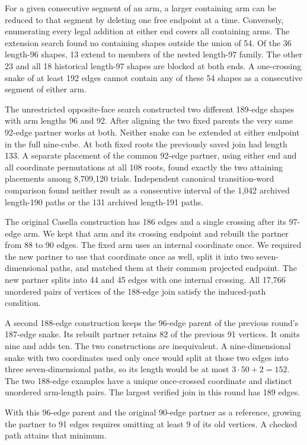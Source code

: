 \documentclass[11pt,a4paper]{article}
\theoremstyle{definition}
\theoremstyle{remark}
\begin{document}
For a given consecutive segment of an arm, a larger containing arm
can be reduced to that segment by deleting one free endpoint at a time.
Conversely, enumerating every legal addition at either end covers all
containing arms. The extension search found no containing shapes outside
the union of 54. Of the 36 length-96 shapes, 13 extend to members of
the nested length-97 family. The other 23 and all 18 historical
length-97 shapes are blocked at both ends. A one-crossing snake of at least 192 edges cannot contain any of these 54 shapes as a consecutive segment of either arm.

The unrestricted opposite-face search constructed two different
189-edge shapes with arm lengths 96 and 92. After aligning the two
fixed parents the very same 92-edge partner works at both. Neither
snake can be extended at either endpoint in the full nine-cube. At both fixed roots the
previously saved join had length 133. A separate placement of the
common 92-edge partner, using either end and all coordinate
permutations at all 108 roots, found exactly the two attaining
placements among 8,709,120 trials. Independent canonical transition-word
comparison found neither result as a consecutive interval of the
1,042 archived length-190 paths or the 131 archived length-191 paths.

The original Casella construction has 186 edges and a single crossing
after its 97-edge arm. We kept that arm and its crossing endpoint and
rebuilt the partner from 88 to 90 edges. The fixed arm uses an internal
coordinate once. We required the new partner to use that coordinate
once as well, split it into two seven-dimensional paths, and matched
them at their common projected endpoint. The new partner splits into
44 and 45 edges with one internal crossing. All 17,766 unordered
pairs of vertices of the 188-edge join satisfy the induced-path
condition.

A second 188-edge construction keeps the 96-edge parent of the
previous round's 187-edge snake. Its rebuilt partner retains 82 of the
previous 91 vertices. It omits nine and adds ten. The two constructions
are inequivalent. A nine-dimensional snake with two coordinates
used only once would split at those two edges into three
seven-dimensional paths, so its length would be at most
\(3\cdot 50+2=152\). The two 188-edge examples have a unique
once-crossed coordinate and distinct unordered arm-length pairs. The largest verified join in this round has 189 edges.

With this 96-edge parent and the original 90-edge partner as a reference, growing the partner to 91 edges requires omitting at least 9 of its old vertices. A checked path attains that minimum.
\end{document}
